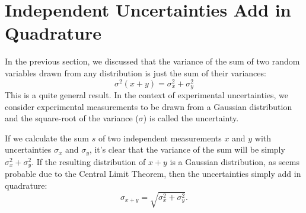 \documentclass[12pt,oneside]{book}
\begin{document}
\section{Independent Uncertainties Add in Quadrature}

In the previous section, we discussed that the variance of the sum of
two random variables drawn from any distribution is just the sum of
their variances:
\begin{displaymath}
\sigma^2(x+y) = \sigma^2_x + \sigma^2_y
\end{displaymath}
This is a quite general result.  In the context of experimental
uncertainties, we consider experimental measurements to be drawn from
a Gaussian distribution and the square-root of the variance ($\sigma$)
is called the uncertainty.

If we calculate the sum $s$ of two independent measurements $x$ and
$y$ with uncertainties $\sigma_x$ and $\sigma_y$, it's clear that the
variance of the sum will be simply $\sigma^2_x + \sigma^2_y$.  If the
resulting distribution of $x+y$ is a Gaussian distribution, as seems
probable due to the Central Limit Theorem, then the uncertainties
simply add in quadrature:
\begin{displaymath}
\sigma_{x+y} = \sqrt{\sigma^2_x + \sigma^2_y}.
\end{displaymath}
\end{document}
